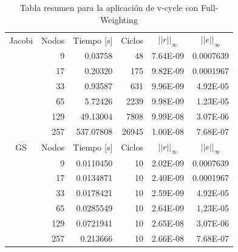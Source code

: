 \documentclass[letter,10pt]{article}
\begin{document}
\begin{table}[H]
\centering
\caption{Tabla resumen para la aplicación de v-cycle con Full-Weighting}
\begin{tabular}[t]{|l|r|r|r|r|r|}
\hline
\multicolumn{ 1}{|c|}{Jacobi} & \multicolumn{1}{l|}{Nodos} & \multicolumn{1}{l|}{Tiempo [s]}& \multicolumn{1}{l|}{Ciclos} & \multicolumn{1}{c|}{$||r||_{\infty}$} & \multicolumn{1}{c|}{$||e||_{\infty}$} \\ \cline{ 2- 6}
\multicolumn{ 1}{|l|}{} &9 & 0.03758& 48 & 7.64E-09 & 0.0007639 \\ \cline{ 2- 6}
\multicolumn{ 1}{|l|}{} & 17 & 0.20320 & 175 & 9.82E-09 & 0.0001967 \\ \cline{ 2- 6}
\multicolumn{ 1}{|l|}{} & 33 & 0.93587 & 631 & 9.96E-09 & 4.92E-05 \\ \cline{ 2- 6}
\multicolumn{ 1}{|l|}{} & 65 & 5.72426 & 2239 & 9.98E-09 & 1.23E-05 \\ \cline{ 2- 6}
\multicolumn{ 1}{|l|}{} & 129 & 49.13004 & 7808 & 9.99E-08 & 3.07E-06 \\ \cline{ 2- 6}
\multicolumn{ 1}{|l|}{} & 257 & 537.07808 & 26945 & 1.00E-08 &7.68E-07 \\ \hline

\multicolumn{ 1}{|c|}{GS} & \multicolumn{1}{l|}{Nodos} & \multicolumn{1}{l|}{Tiempo [s]}& \multicolumn{1}{l|}{Ciclos} & \multicolumn{1}{c|}{$||r||_{\infty}$} & \multicolumn{1}{c|}{$||e||_{\infty}$} \\ \cline{ 2- 6}
\multicolumn{ 1}{|l|}{} &9 & 0.0110450 & 10 & 2.02E-09 & 0.0007639 \\ \cline{ 2- 6}
\multicolumn{ 1}{|l|}{} & 17 & 0.0134871 & 10 & 2.40E-09 & 0.0001967 \\ \cline{ 2- 6}
\multicolumn{ 1}{|l|}{} & 33 & 0.0178421 & 10 & 2.59E-09 & 4.92E-05 \\ \cline{ 2- 6}
\multicolumn{ 1}{|l|}{} & 65 & 0.0285549 & 10 & 2.64E-09 & 1,23E-05 \\ \cline{ 2- 6}
\multicolumn{ 1}{|l|}{} & 129 & 0.0721941 & 10 & 2.65E-08 & 3,07E-06 \\ \cline{ 2- 6}
\multicolumn{ 1}{|l|}{} & 257 & 0.213666 & 10 & 2.66E-08 & 7.68E-07 \\ \hline


\end{tabular}
\end{table}
\end{document}
